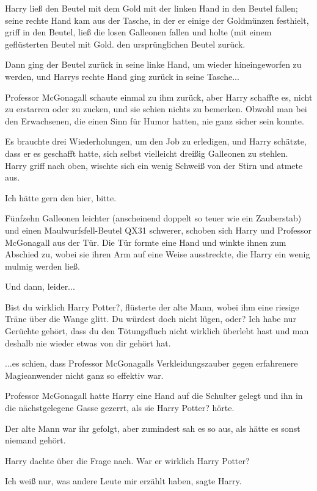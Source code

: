 Harry ließ den Beutel mit dem Gold mit der linken Hand in den Beutel fallen;
seine rechte Hand kam aus der Tasche, in der er einige der Goldmünzen festhielt,
griff in den Beutel, ließ die losen Galleonen fallen und holte (mit einem
geflüsterten \glqq{}Beutel mit Gold\grqq{}. den ursprünglichen Beutel zurück.

Dann ging der Beutel zurück in seine linke Hand, um wieder hineingeworfen zu
werden, und Harrys rechte Hand ging zurück in seine Tasche...

Professor McGonagall schaute einmal zu ihm zurück, aber Harry schaffte es, nicht
zu erstarren oder zu zucken, und sie schien nichts zu bemerken. Obwohl man bei
den Erwachsenen, die einen Sinn für Humor hatten, nie ganz sicher sein konnte.

Es brauchte drei Wiederholungen, um den Job zu erledigen, und Harry schätzte,
dass er es geschafft hatte, sich selbst vielleicht dreißig Galleonen zu stehlen.
Harry griff nach oben, wischte sich ein wenig Schweiß von der Stirn und atmete
aus.

\glqq{}Ich hätte gern den hier, bitte.\grqq{}

Fünfzehn Galleonen leichter (anscheinend doppelt so teuer wie ein Zauberstab)
und einen Maulwurfsfell-Beutel QX31 schwerer, schoben sich Harry und Professor
McGonagall aus der Tür. Die Tür formte eine Hand und winkte ihnen zum Abschied
zu, wobei sie ihren Arm auf eine Weise ausstreckte, die Harry ein wenig mulmig
werden ließ.

Und dann, leider...

\glqq{}Bist du wirklich Harry Potter?\grqq{}, flüsterte der alte Mann, wobei ihm
eine riesige Träne über die Wange glitt. \glqq{}Du würdest doch nicht lügen,
oder? Ich habe nur Gerüchte gehört, dass du den Tötungsfluch nicht wirklich
überlebt hast und man deshalb nie wieder etwas von dir gehört hat.\grqq{}

...es schien, dass Professor McGonagalls Verkleidungszauber gegen erfahrenere
Magieanwender nicht ganz so effektiv war.

Professor McGonagall hatte Harry eine Hand auf die Schulter gelegt und ihn in
die nächstgelegene Gasse gezerrt, als sie \glqq{}Harry Potter?\grqq{} hörte.

Der alte Mann war ihr gefolgt, aber zumindest sah es so aus, als hätte es sonst
niemand gehört.

Harry dachte über die Frage nach. War er wirklich Harry Potter?

\glqq{}Ich weiß nur, was andere Leute mir erzählt haben\grqq{}, sagte Harry.

